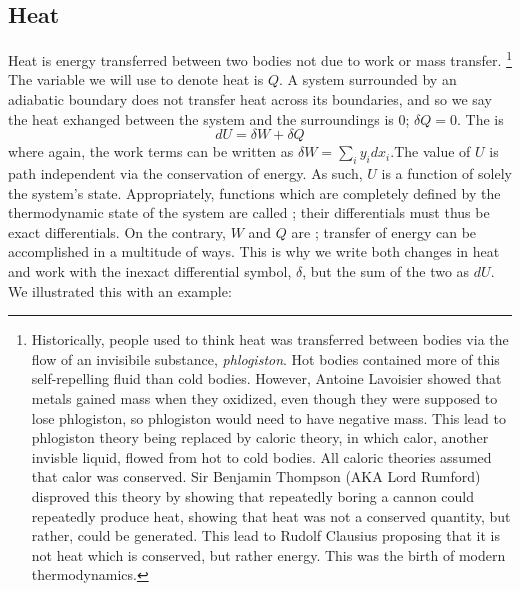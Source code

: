 \documentclass[12pt]{article}
\begin{document}
\subsection{Heat}
Heat is energy transferred between two bodies not due to work or mass transfer.
\footnote{Historically, people used to think heat was transferred between bodies via the flow of an invisibile substance, \textit{phlogiston}. Hot bodies contained more of this self-repelling fluid than cold bodies. However, Antoine Lavoisier showed that metals gained mass when they oxidized, even though they were supposed to lose phlogiston, so phlogiston would need to have negative mass. This lead to phlogiston theory being replaced by caloric theory, in which calor, another invisble liquid, flowed from hot to cold bodies. All caloric theories assumed that calor was conserved. Sir Benjamin Thompson (AKA Lord Rumford) disproved this theory by showing that repeatedly boring a cannon could repeatedly produce heat, showing that heat was not a conserved quantity, but rather, could be generated. This lead to Rudolf Clausius proposing that it is not heat which is conserved, but rather energy. This was the birth of modern thermodynamics.}  The variable we will use to denote heat is $Q$.  A system surrounded by an adiabatic boundary does not transfer heat across its boundaries, and so we say the heat exhanged between the system and the surroundings is 0; $\delta Q = 0$.  The  is
\begin{equation}\boxed{
dU = \delta W + \delta Q
}\end{equation}
where again, the work terms can be written as $\delta W = \sum_i y_i dx_i$.The value of $U$ is path independent via the conservation of energy. As such, $U$ is a function of solely the system's state. Appropriately, functions which are completely defined by the thermodynamic state of the system are called ; their differentials must thus be exact differentials. On the contrary, $W$ and $Q$ are ; transfer of energy can be accomplished in a multitude of ways.  This is why we write both changes in heat and work with the inexact differential symbol, $\delta$, but the sum of the two as $dU$. We illustrated this with an example:
\end{document}
